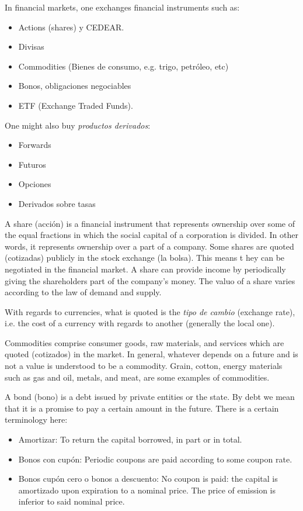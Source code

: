 \documentclass[a4paper, 12pt]{article}
\theoremstyle{definition}
\begin{document}
In financial markets, one exchanges financial instruments such as:

\begin{itemize}
    \item Actions (shares) y CEDEAR. 
    \item Divisas 
    \item Commodities (Bienes de consumo, e.g. trigo, petróleo, etc)
    \item Bonos, obligaciones negociables
    \item ETF (Exchange Traded Funds).
\end{itemize}

One might also buy \textit{productos derivados}:

\begin{itemize}
    \item Forwards
    \item Futuros 
    \item Opciones 
    \item Derivados sobre tasas
\end{itemize}

A share (acción) is a financial instrument that represents ownership over some
of the equal fractions in which the social capital of a corporation is divided.
In other words, it represents ownership over a part of a company. Some shares
are quoted (cotizadas) publicly in the stock exchange (la bolsa). This means t
hey can be negotiated in the financial market. A share can provide income by
periodically giving the shareholders part of the company's money. The valuo of a
share varies according to the law of demand and supply.

With regards to currencies, what is quoted is the \textit{tipo de cambio}
(exchange rate), i.e. the cost of a currency with regards to another (generally
the local one).

Commodities comprise consumer goods, raw materials, and services which are
quoted (cotizados) in the market. In general, whatever depends on a future and
is not a value is understood to be a commodity. Grain, cotton, energy materials
such as gas and oil, metals, and meat, are some examples of commodities.

A bond (bono) is a debt issued by private entities or the state. By debt we mean
that it is a promise to pay a certain amount in the future. There is a certain
terminology here:

\begin{itemize}
    \item Amortizar: To return the capital borrowed, in part or in total. 
    \item Bonos con cupón: Periodic coupons are paid according to some coupon
        rate. 
    \item Bonos cupón cero o bonos a descuento: No coupon is paid: the capital
    is amortizado upon expiration to a nominal price. The price of emission is
    inferior to said nominal price.
\end{itemize}
\end{document}

